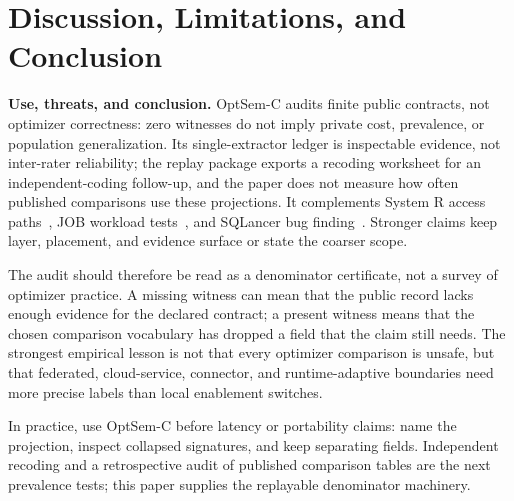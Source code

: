\section{Discussion, Limitations, and Conclusion}
\label{sec:discussion}

\textbf{Use, threats, and conclusion.}  OptSem-C audits finite public contracts, not optimizer correctness: zero witnesses do not imply private cost, prevalence, or population generalization.  Its single-extractor ledger is inspectable evidence, not inter-rater reliability; the replay package exports a recoding worksheet for an independent-coding follow-up, and the paper does not measure how often published comparisons use these projections.  It complements System R access paths~\cite{selinger1979access}, JOB workload tests~\cite{leis2018looking}, and SQLancer bug finding~\cite{rigger2020sqlancer}.  Stronger claims keep layer, placement, and evidence surface or state the coarser scope.

The audit should therefore be read as a denominator certificate, not a survey of optimizer practice.  A missing witness can mean that the public record lacks enough evidence for the declared contract; a present witness means that the chosen comparison vocabulary has dropped a field that the claim still needs.  The strongest empirical lesson is not that every optimizer comparison is unsafe, but that federated, cloud-service, connector, and runtime-adaptive boundaries need more precise labels than local enablement switches.

In practice, use OptSem-C before latency or portability claims: name the projection, inspect collapsed signatures, and keep separating fields.  Independent recoding and a retrospective audit of published comparison tables are the next prevalence tests; this paper supplies the replayable denominator machinery.
